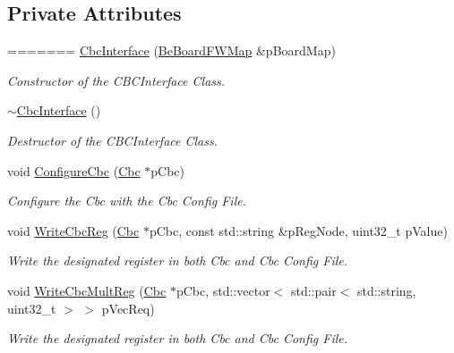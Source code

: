 \subsection*{Private Attributes}
=======
\hyperlink{class_ph2___hw_interface_1_1_cbc_interface_a405f25c67abece1967d0bd0d738afbe1}{Cbc\-Interface} (\hyperlink{namespace_ph2___hw_interface_ac35d341eb47fa7cbe4d28ccbc6ab4875}{Be\-Board\-F\-W\-Map} \&p\-Board\-Map)
\begin{DoxyCompactList}\small\item\em Constructor of the C\-B\-C\-Interface Class. \end{DoxyCompactList}\item 
\hyperlink{class_ph2___hw_interface_1_1_cbc_interface_a1f0ab7d7cf7783a0fe275e8e1d7e5a49}{$\sim$\-Cbc\-Interface} ()
\begin{DoxyCompactList}\small\item\em Destructor of the C\-B\-C\-Interface Class. \end{DoxyCompactList}\item 
void \hyperlink{class_ph2___hw_interface_1_1_cbc_interface_a0567c7a31f70f446202e60d037c869ea}{Configure\-Cbc} (\hyperlink{class_ph2___hw_description_1_1_cbc}{Cbc} $\ast$p\-Cbc)
\begin{DoxyCompactList}\small\item\em Configure the Cbc with the Cbc Config File. \end{DoxyCompactList}\item 
void \hyperlink{class_ph2___hw_interface_1_1_cbc_interface_ab829827bd983bf5a2b1cd1852fd3398c}{Write\-Cbc\-Reg} (\hyperlink{class_ph2___hw_description_1_1_cbc}{Cbc} $\ast$p\-Cbc, const std\-::string \&p\-Reg\-Node, uint32\-\_\-t p\-Value)
\begin{DoxyCompactList}\small\item\em Write the designated register in both Cbc and Cbc Config File. \end{DoxyCompactList}\item 
void \hyperlink{class_ph2___hw_interface_1_1_cbc_interface_ad41bf5b158c744e918a8a72b92af20bf}{Write\-Cbc\-Mult\-Reg} (\hyperlink{class_ph2___hw_description_1_1_cbc}{Cbc} $\ast$p\-Cbc, std\-::vector$<$ std\-::pair$<$ std\-::string, uint32\-\_\-t $>$ $>$ p\-Vec\-Req)
\begin{DoxyCompactList}\small\item\em Write the designated register in both Cbc and Cbc Config File. \end{DoxyCompactList}\item 
